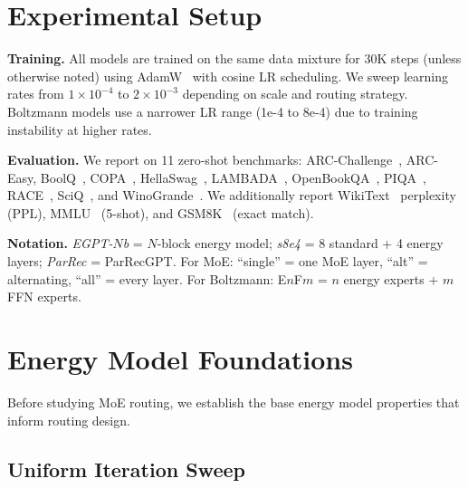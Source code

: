 \documentclass[oneside]{article}
\begin{document}
\section{Experimental Setup}

\textbf{Training.} All models are trained on the same data mixture for 30K steps (unless otherwise noted) using AdamW~\citep{loshchilov2019decoupled} with cosine LR scheduling. We sweep learning rates from $1 \times 10^{-4}$ to $2 \times 10^{-3}$ depending on scale and routing strategy. Boltzmann models use a narrower LR range (1e-4 to 8e-4) due to training instability at higher rates.

\textbf{Evaluation.} We report on 11 zero-shot benchmarks: ARC-Challenge~\citep{clark2018think}, ARC-Easy, BoolQ~\citep{clark2019boolq}, COPA~\citep{roemmele2011choice}, HellaSwag~\citep{zellers2019hellaswag}, LAMBADA~\citep{paperno2016lambada}, OpenBookQA~\citep{mihaylov2018can}, PIQA~\citep{bisk2020piqa}, RACE~\citep{lai2017race}, SciQ~\citep{welbl2017crowdsourcing}, and WinoGrande~\citep{sakaguchi2020winogrande}. We additionally report WikiText~\citep{merity2017pointer} perplexity (PPL), MMLU~\citep{hendrycks2021measuring} (5-shot), and GSM8K~\citep{cobbe2021training} (exact match).

\textbf{Notation.} \textit{EGPT-$N$b} = $N$-block energy model; \textit{s8e4} = 8 standard + 4 energy layers; \textit{ParRec} = ParRecGPT. For MoE: ``single'' = one MoE layer, ``alt'' = alternating, ``all'' = every layer. For Boltzmann: E$n$F$m$ = $n$ energy experts + $m$ FFN experts.


\section{Energy Model Foundations}
\label{sec:foundations}

Before studying MoE routing, we establish the base energy model properties that inform routing design.

\subsection{Uniform Iteration Sweep}
\end{document}

